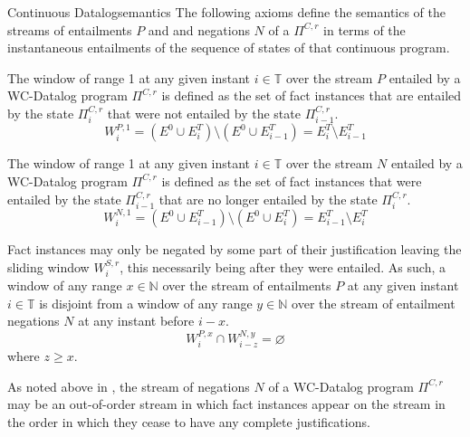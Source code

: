 \begin{nestedsection}{Continuous Datalog}{semantics}
The following axioms define the semantics of the streams of
entailments $P$ and and negations $N$ of a $\Pi^{C,r}$ in terms of the
instantaneous entailments of the sequence of states of that continuous
program.

\begin{axiom}
\label{axiom:continuous datalog: positive window increment}
The window of range 1 at any given instant ${i \in \mathbb{T}}$ over
the stream $P$ entailed by a WC-Datalog program $\Pi^{C,r}$ is defined
as the set of fact instances that are entailed by the state
$\Pi^{C,r}_i$ that were not entailed by the state $\Pi^{C,r}_{i-1}$.
\begin{equation*}
W^{P,1}_{i} = \left( E^0 \cup E^T_{i} \right) \setminus
\left( E^0 \cup E^T_{i-1} \right) = E^T_{i} \setminus E^T_{i-1}
\end{equation*}
\end{axiom}

\begin{axiom}
\label{axiom:continuous datalog: negative window increment}
The window of range 1 at any given instant ${i \in \mathbb{T}}$ over
the stream $N$ entailed by a WC-Datalog program $\Pi^{C,r}$ is defined
as the set of fact instances that were entailed by the state
$\Pi^{C,r}_{i-1}$ that are no longer entailed by the state
$\Pi^{C,r}_i$.
\begin{equation*}
W^{N,1}_{i} = \left( E^0 \cup E^T_{i-1} \right) \setminus
\left( E^0 \cup E^T_{i} \right) = E^T_{i-1} \setminus E^T_{i}
\end{equation*}
\end{axiom}

\begin{axiom}
\label{axiom:continuous datalog: entailment precedes negation}
Fact instances may only be negated by some part of their justification
leaving the sliding window $W^{S,r}_{i}$, this necessarily being after
they were entailed.  As such, a window of any range ${x \in
  \mathbb{N}}$ over the stream of entailments $P$ at any given instant
${i \in \mathbb{T}}$ is disjoint from a window of any range ${y \in
  \mathbb{N}}$ over the stream of entailment negations $N$ at any
instant before ${i - x}$.
\begin{equation*}
  W^{P,x}_{i} \cap W^{N,y}_{i-z} = \varnothing
\end{equation*}
where $z \geq x$.
\end{axiom}

As noted above in , the stream of
negations $N$ of a WC-Datalog program $\Pi^{C,r}$ may be an
out-of-order stream in which fact instances appear on the stream in
the order in which they cease to have any complete justifications.


\end{nestedsection}
